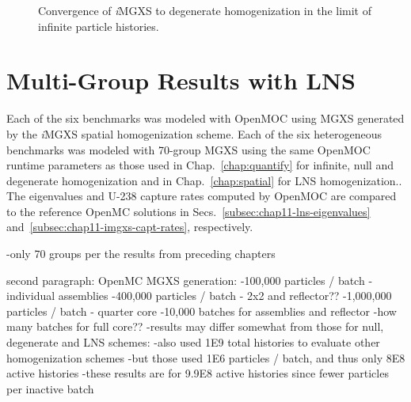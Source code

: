 \begin{figure}[h!]
\centering
{}
\caption[Convergence of\textit{i}MGXS to degenerate homogenization]{Convergence of \textit{i}\ac{MGXS} to degenerate homogenization in the limit of infinite particle histories.}
\label{fig:chap11-coverge-complexity}
\end{figure}

\section{Multi-Group Results with LNS}
\label{subsec:chap11-imgxs-results}

Each of the six benchmarks was modeled with OpenMOC using \ac{MGXS} generated by the \textit{i}\ac{MGXS} spatial homogenization scheme. Each of the six heterogeneous benchmarks was modeled with 70-group \ac{MGXS} using the same OpenMOC runtime parameters as those used in Chap.~\ref{chap:quantify} for infinite, null and degenerate homogenization and in Chap.~\ref{chap:spatial} for \ac{LNS} homogenization.. The eigenvalues and U-238 capture rates computed by OpenMOC are compared to the reference OpenMC solutions in Secs.~\ref{subsec:chap11-lns-eigenvalues} and~\ref{subsec:chap11-imgxs-capt-rates}, respectively.

-only 70 groups per the results from preceding chapters

second paragraph: OpenMC MGXS generation:
-100,000 particles / batch - individual assemblies
-400,000 particles / batch - 2x2 and reflector??
-1,000,000 particles / batch - quarter core
-10,000 batches for assemblies and reflector
-how many batches for full core??
-results may differ somewhat from those for null, degenerate and LNS schemes:
  -also used 1E9 total histories to evaluate other homogenization schemes
  -but those used 1E6 particles / batch, and thus only 8E8 active histories
  -these results are for 9.9E8 active histories since fewer particles per inactive batch

